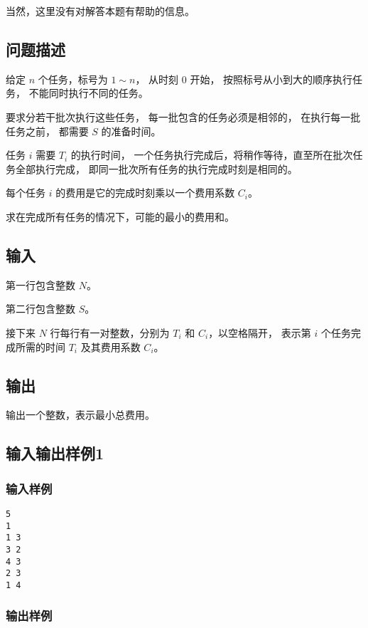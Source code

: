 \documentclass[UTF8]{ctexart}
\begin{document}
当然，这里没有对解答本题有帮助的信息。

\subsection{问题描述}

给定 $n$ 个任务，标号为 $1\sim n$， 从时刻 $0$ 开始， 按照标号从小到大的顺序执行任务， 不能同时执行不同的任务。

要求分若干批次执行这些任务， 每一批包含的任务必须是相邻的， 在执行每一批任务之前， 都需要 $S$ 的准备时间。

任务 $i$ 需要 $T_i$ 的执行时间， 一个任务执行完成后，将稍作等待，直至所在批次任务全部执行完成， 即同一批次所有任务的执行完成时刻是相同的。

每个任务 $i$ 的费用是它的完成时刻乘以一个费用系数 $C_i$。

求在完成所有任务的情况下，可能的最小的费用和。

\subsection{输入} 

第一行包含整数 $N$。

第二行包含整数 $S$。

接下来 $N$ 行每行有一对整数，分别为 $T_i$ 和 $C_i$，以空格隔开， 表示第 $i$ 个任务完成所需的时间 $T_i$ 及其费用系数 $C_i$。

\subsection{输出}

输出一个整数，表示最小总费用。

\subsection{输入输出样例1}

\subsubsection{输入样例}

\begin{lstlisting}
5
1
1 3
3 2
4 3
2 3
1 4
\end{lstlisting}

\subsubsection{输出样例}
\end{document}
